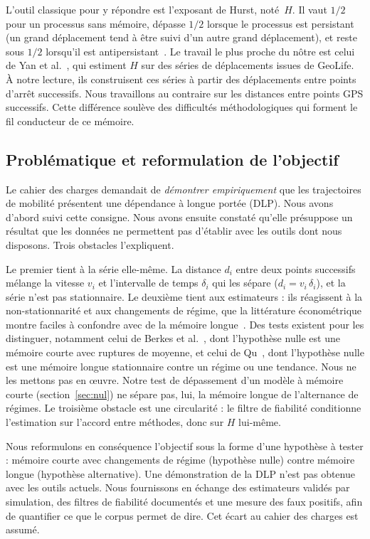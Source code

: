 \documentclass[11pt,a4paper]{article}
\renewcommand{\_}{\textunderscore\penalty0\hspace{0pt}}
\begin{document}
L'outil classique pour y répondre est l'exposant de Hurst, noté~$H$. Il vaut $1/2$ pour un
processus sans mémoire, dépasse $1/2$ lorsque le processus est persistant (un grand
déplacement tend à être suivi d'un autre grand déplacement), et reste sous $1/2$ lorsqu'il
est antipersistant~\cite{mandelbrot1968}. Le travail le plus proche du nôtre est celui de
Yan et al.~\cite{yan2014}, qui estiment $H$ sur des séries de déplacements issues de
GeoLife. À notre lecture, ils construisent ces séries à partir des déplacements entre
points d'arrêt successifs. Nous travaillons au contraire sur les distances entre points GPS
successifs. Cette différence soulève des difficultés méthodologiques qui forment le fil
conducteur de ce mémoire.

\subsection{Problématique et reformulation de l'objectif}
\label{sec:problematique}

Le cahier des charges demandait de \emph{démontrer empiriquement} que les trajectoires de
mobilité présentent une dépendance à longue portée (DLP). Nous avons d'abord suivi cette
consigne. Nous avons ensuite constaté qu'elle présuppose un résultat que les données ne
permettent pas d'établir avec les outils dont nous disposons. Trois obstacles l'expliquent.

Le premier tient à la série elle-même. La distance $d_i$ entre deux points successifs
mélange la vitesse $v_i$ et l'intervalle de temps $\delta_i$ qui les sépare
($d_i = v_i\,\delta_i$), et la série n'est pas stationnaire. Le deuxième tient aux
estimateurs : ils réagissent à la non-stationnarité et aux changements de régime, que la
littérature économétrique montre faciles à confondre avec de la mémoire
longue~\cite{diebold2001}. Des tests existent pour les distinguer, notamment celui de
Berkes et al.~\cite{berkes2006}, dont l'hypothèse nulle est une mémoire courte avec
ruptures de moyenne, et celui de Qu~\cite{qu2011}, dont l'hypothèse nulle est une mémoire
longue stationnaire contre un régime ou une tendance. Nous ne les mettons pas en œuvre.
Notre test de dépassement d'un modèle à mémoire courte (section~\ref{sec:nul}) ne sépare
pas, lui, la mémoire longue de l'alternance de régimes. Le troisième obstacle est une
circularité : le filtre de fiabilité conditionne l'estimation sur l'accord entre méthodes,
donc sur $H$ lui-même.

Nous reformulons en conséquence l'objectif sous la forme d'une hypothèse à tester :
mémoire courte avec changements de régime (hypothèse nulle) contre mémoire longue
(hypothèse alternative). Une démonstration de la DLP n'est pas obtenue avec les outils
actuels. Nous fournissons en échange des estimateurs validés par simulation, des filtres de
fiabilité documentés et une mesure des faux positifs, afin de quantifier ce que le corpus
permet de dire. Cet écart au cahier des charges est assumé.
\end{document}
